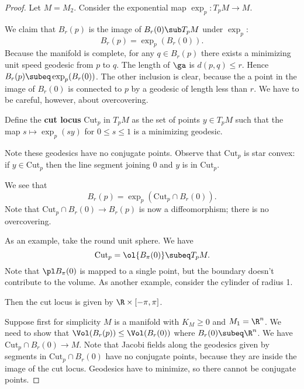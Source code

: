 \begin{proof}
Let $M=M_2$. Consider the exponential map $\exp_p: T_pM\to M$. 

We claim that $B_r(p)$ is the image of $B_r(0)\sub T_pM$ under $\exp_p$:
\[
B_r(p)=\exp_p(B_r(0)).
\]
Because the manifold is complete, for any $q\in B_r(p)$ there exists a minimizing unit speed geodesic from $p$ to $q$. The length of $\ga$ is $d(p,q)\le r$. Hence $B_r(p)\subeq \exp_p(B_r(0))$. The other inclusion is clear, because the a point in the image of $B_r(0)$ is connected to $p$ by a geodesic of length less than $r$. We have to be careful, however, about overcovering.

\begin{df}
Define the \textbf{cut locus} $\text{Cut}_p$ in $T_pM$ as the set of points $y\in T_pM$ such that the map $s\mapsto \exp_p(sy)$ for $0\le s\le 1$ is a minimizing geodesic.
\end{df}
Note these geodesics have no conjugate points. Observe that $\text{Cut}_p$ is star convex: if $y\in \text{Cut}_p$ then the line segment joining 0 and $y$ is in $\text{Cut}_p$.

We see that
\[
B_r(p)=\exp_p(\text{Cut}_p\cap B_r(0)).
\]
Note that $\text{Cut}_p\cap B_r(0)\to B_r(p)$ is now a diffeomorphism; %
there is no overcovering. %

As an example, take the round unit sphere. We have
\[
\text{Cut}_p= \ol{B_{\pi}(0)}\subeq T_pM.
\]
Note that $\pl B_{\pi}(0)$ is mapped to a single point, but the boundary doesn't contribute to the volume.
As another example, consider the cylinder of radius 1.


Then the cut locus is given by $\R\times [-\pi,\pi]$.

Suppose first for simplicity $M$ is a manifold with $K_M\ge 0$ and $M_1=\R^n$. We need to show that $\Vol(B_r(p))\le \Vol(B_r(0))$ where $B_r(0)\subeq \R^n$. We have $\text{Cut}_p\cap B_r(0)\to M$.
Note that Jacobi fields along the geodesics given by segments in $\text{Cut}_p\cap B_r(0)$ have no conjugate points, because they are inside the image of the cut locus. Geodesics have to minimize, so there cannot be conjugate points. 


\end{proof}
